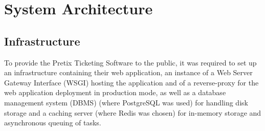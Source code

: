 \documentclass[12pt]{article}
\begin{document}



\newpage
\section{System Architecture} \label{architecture} %

\subsection{Infrastructure} \label{architecture.infrastructure} %


To provide the Pretix Ticketing Software \cite{pretix} to the public, it was required to set up an infrastructure containing their web application, an instance
of a Web Server Gateway Interface (WSGI) hosting the application and of a reverse-proxy for the web application deployment in production mode, as well as a
database management system (DBMS) (where PostgreSQL was used) for handling disk storage and a caching server (where Redis was chosen) for in-memory storage and
asynchronous queuing of tasks.
\end{document}
